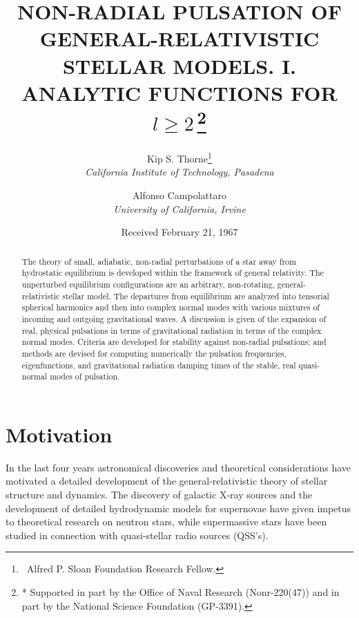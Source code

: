 
\title{NON-RADIAL PULSATION OF GENERAL-RELATIVISTIC STELLAR MODELS.
I. ANALYTIC FUNCTIONS FOR $l \geq 2$\,\footnote{* Supported in part by the Office of Naval Research (Nonr-220(47)) and in part by the National Science Foundation (GP-3391).}}

\author{Kip S. Thorne\footnote{\dag\ Alfred P. Sloan Foundation Research Fellow.}\\
\textit{California Institute of Technology, Pasadena}\\
\and
Alfonso Campolattaro\\
\textit{University of California, Irvine}}

\date{Received February 21, 1967}

\maketitle

\begin{abstract}
The theory of small, adiabatic, non-radial perturbations of a star away from hydrostatic equilibrium
is developed within the framework of general relativity. The unperturbed equilibrium configurations are
an arbitrary, non-rotating, general-relativistic stellar model. The departures from equilibrium are
analyzed into tensorial spherical harmonics and then into complex normal modes with various mixtures
of incoming and outgoing gravitational waves. A discussion is given of the expansion of real, physical
pulsations in terms of gravitational radiation in terms of the complex normal modes. Criteria
are developed for stability against non-radial pulsations; and methods are devised for computing numerically the pulsation frequencies, eigenfunctions, and gravitational radiation damping times of the stable,
real quasi-normal modes of pulsation.
\end{abstract}

\section{Motivation}

In the last four years astronomical discoveries and theoretical considerations have
motivated a detailed development of the general-relativistic theory of stellar structure
and dynamics. The discovery of galactic X-ray sources and the development of detailed
hydrodynamic models for supernovae have given impetus to theoretical research on neutron
stars, while supermassive stars have been studied in connection with quasi-stellar radio
sources (QSS's).

